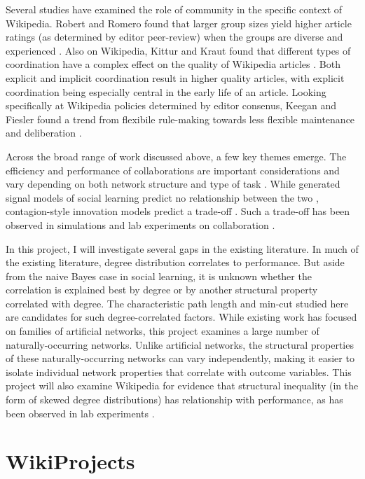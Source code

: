 Several studies have examined the role of community in the specific context
of Wikipedia.
Robert and Romero found that
larger group sizes yield higher article ratings
(as determined by editor peer-review)
when the groups are diverse and experienced
\cite{robert_crowd_2015}.
Also on Wikipedia,
Kittur and Kraut found that different types of coordination have a complex
effect on the quality of Wikipedia articles \cite{kittur_harnessing_2008}.
Both explicit and implicit coordination result in higher quality articles,
with explicit coordination being especially central in the early life of an
article.
Looking specifically at Wikipedia policies determined by editor consenus,
Keegan and Fiesler found a trend
from flexibile rule-making towards less flexible maintenance and deliberation
\cite{keegan_evolution_2017}.

Across the broad range of work discussed above,
a few key themes emerge.
The efficiency and performance of collaborations are important considerations
and vary depending on both network structure and type of task
\cite{kearns_experiments_2012}.
While generated signal models of social learning predict no relationship between the two
\cite{golub_naive_2010},
contagion-style innovation models predict a trade-off
\cite{mason_collaborative_2012,barkoczi_social_2016}.
Such a trade-off has been observed in simulations and lab experiments on
collaboration
\cite{kearns_experiments_2012,grim_scientific_2013}.

In this project, I will investigate several gaps in the existing literature.
In much of the existing literature,
degree distribution correlates to performance.
But aside from the naive Bayes case in social learning, it is unknown whether
the correlation is explained best by degree or by another structural property
correlated with degree.
The characteristic path length and min-cut studied here are candidates for such
degree-correlated factors.
While existing work has focused on families of artificial networks,
this project examines a large number of naturally-occurring networks.
Unlike artificial networks, the structural properties of these naturally-occurring
networks can vary independently, making it easier to isolate individual
network properties that correlate with outcome variables.
This project will also examine Wikipedia for evidence that structural
inequality (in the form of skewed degree distributions)
has relationship with performance,
as has been observed in lab experiments
\cite{kearns_experiments_2012}.

\section{WikiProjects}
\label{sec:wp}

